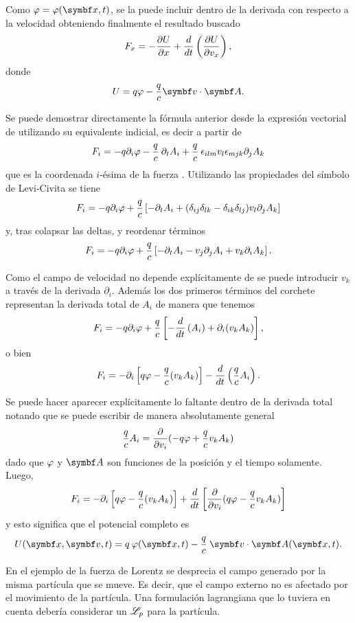 \documentclass[10pt,oneside]{CBFT_book}
\begin{document}
Como $\vp=\vp(\vb{x},t)$, se la puede incluir dentro de la derivada con respecto a la velocidad obteniendo finalmente el 
resultado buscado
\[
	F_x = -\frac{\partial^{\hspace{-0.05em}} { U }}{\partial { x }^{\hspace{-0.05em}}} + \frac{d^{\hspace{-0.05em}} { }}{d {t}^{\hspace{-0.05em}}}\left( \frac{\partial^{\hspace{-0.05em}} {U}}{\partial {v_x}^{\hspace{-0.05em}}} \right),
\]
donde 
\[
	U = q \vp - \frac{q}{c} \pe{v}{A}.
\]
 

Se puede demostrar directamente la fórmula anterior desde la expresión vectorial de  utilizando su equivalente 
indicial, es decir a partir de
\[
	F_i = -q \partial_i \varphi - \frac{q}{c} \:\partial_t A_i + \frac{q}{c} \: \epsilon_{ilm} v_l \epsilon_{mjk} 
	\partial_j A_k
\]
que es la coordenada $i$-ésima de la fuerza . Utilizando las propiedades del símbolo de Levi-Civita se tiene 
\[
	F_i = -q \partial_i \varphi + \frac{q}{c} \left[  -\partial_t A_i  + (\delta_{ij}\delta_{lk} - \delta_{ik}\delta_{lj}) v_l \partial_j A_k \right]
\]
y, tras colapsar las deltas, y reordenar términos
\[
	F_i = -q \partial_i \varphi + \frac{q}{c} \left[  -\partial_t A_i - v_j \partial_j A_i +  v_k \partial_i A_k  \right].
\]

Como el campo de velocidad  no depende explícitamente de  se puede introducir $v_k$ a través de la derivada $\partial_i$. Además los
dos primeros términos del corchete representan la derivada total de $A_i$ de manera que tenemos
\[
	F_i = -q \partial_i \varphi + \frac{q}{c} \left[  - \frac{d^{\hspace{-0.05em}} {}}{d {t}^{\hspace{-0.05em}}} \left(A_i\right)  + \partial_i (v_k A_k)  \right],
\]
o bien 
\[
	F_i = - \partial_i \left[ q\varphi - \frac{q}{c}  (v_k A_k) \right] -  \frac{d^{\hspace{-0.05em}} {}}{d {t}^{\hspace{-0.05em}}} \left( \frac{q}{c} A_i \right).
\]

Se puede hacer aparecer explícitamente lo faltante dentro de la derivada total notando que se puede escribir de manera absolutamente general
\[
	\frac{q}{c} A_i =  \frac{\partial^{\hspace{-0.05em}} {}}{\partial {v_i}^{\hspace{-0.05em}}} ( - q\varphi + \frac{q}{c} v_k A_k )
\]
dado que $\varphi$ y $\vb{A}$ son funciones de la posición y el tiempo solamente. Luego,
\[
	F_i = - \partial_i \left[ q\varphi - \frac{q}{c}  (v_k A_k) \right] + \frac{d^{\hspace{-0.05em}} {}}{d {t}^{\hspace{-0.05em}}} \left[ \frac{\partial^{\hspace{-0.05em}} {}}{\partial {v_i}^{\hspace{-0.05em}}} ( q\varphi - \frac{q}{c} v_k A_k ) \right]
\]
y esto significa que el potencial completo es
\[
	U(\vb{x},\vb{v},t) = q \: \vp(\vb{x},t) - \frac{q}{c} \: \pe{v}{A}(\vb{x},t).
\]

En el ejemplo de la fuerza de Lorentz se desprecia el campo generado por la misma partícula que se mueve. Es decir, 
que el campo externo no es afectado por el movimiento de la partícula.
Una formulación lagrangiana que lo tuviera en cuenta debería considerar un $\mathscr{L}_p$ para la partícula.
\end{document}

